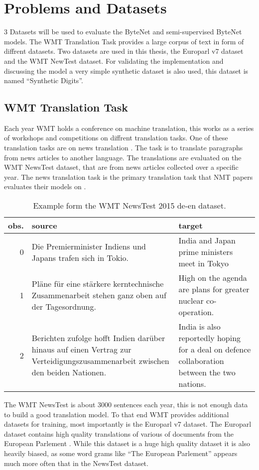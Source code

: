 
\section{Problems and Datasets}

3 Datasets will be used to evaluate the ByteNet and semi-supervised ByteNet models. The WMT Translation Task provides a large corpus of text in form of diffrent datasets. Two datasets are used in this thesis, the Europarl v7 dataset and the WMT NewTest dataset. For validating the implementation and discussing the model a very simple synthetic dataset is also used, this dataset is named ``Synthetic Digits''.

\subsection{WMT Translation Task}

Each year WMT holds a conference on machine translation, this works as a series of workshops and competitions on diffrent translation tasks. One of these translation tasks are on news translation \cite{wmt16}. The task is to translate paragraphs from news articles to another language. The translations are evaluated on the WMT NewsTest dataset, that are from news articles collected over a specific year. The news translation task is the primary translation task that NMT papers evaluates their models on \cite{bytenet, bahdanau-2015-nmt, sutskever-2014-nmt}.

\begin{table}[H]
\centering
\begin{tabular}{r|p{5cm} p{5cm}}
	obs. & source & target\\ \hline
     0 & Die Premierminister Indiens und Japans trafen sich in Tokio. & India and Japan prime ministers meet in Tokyo \\
     1 & Pläne für eine stärkere kerntechnische Zusammenarbeit stehen ganz oben auf der Tagesordnung. & High on the agenda are plans for greater nuclear co-operation. \\
     2 & Berichten zufolge hofft Indien darüber hinaus auf einen Vertrag zur Verteidigungszusammenarbeit zwischen den beiden Nationen. & India is also reportedly hoping for a deal on defence collaboration between the two nations.
\end{tabular}
\caption{Example form the WMT NewsTest 2015 de-en dataset.}
\end{table}

The WMT NewsTest is about 3000 sentences each year, this is not enough data to build a good translation model. To that end WMT provides additional datasets for training, most importantly is the Europarl v7 dataset. The Europarl dataset contains high quality translations of various of documents from the European Parlement \cite{europarl}. While this dataset is a huge high quality dataset it is also heavily biased, as some word grams like ``The European Parlement'' appears much more often that in the NewsTest dataset.

